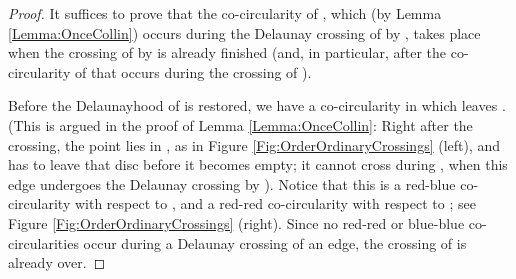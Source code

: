 \documentclass[letter,11pt]{article}
\begin{document}
\begin{proof}
It suffices to prove that the co-circularity of , which (by Lemma \ref{Lemma:OnceCollin}) occurs during the Delaunay crossing of  by , takes place when the crossing of  by  is already finished (and, in particular, after the co-circularity of  that occurs during the crossing of ). 

Before the Delaunayhood of  is restored, we have a co-circularity  in which  leaves . (This is argued in the proof of Lemma \ref{Lemma:OnceCollin}: Right after the crossing, the point  lies in , as in Figure \ref{Fig:OrderOrdinaryCrossings} (left), and has to leave that disc before it becomes empty; it cannot cross  during , when this edge undergoes the Delaunay crossing by ). Notice that this is a red-blue co-circularity with respect to , and a red-red co-circularity with respect to ; see Figure \ref{Fig:OrderOrdinaryCrossings} (right). Since no red-red or blue-blue co-circularities occur during a Delaunay crossing of an edge, the crossing of  is already over.
\end{proof}
\end{document}
